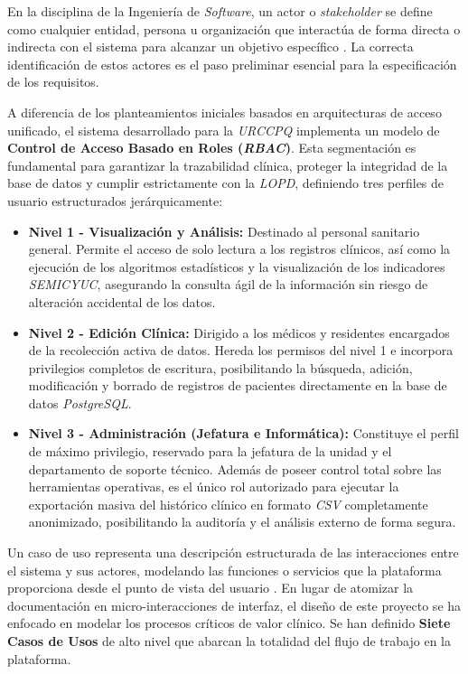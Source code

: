 En la disciplina de la Ingeniería de \textit{Software}, un actor o \textit{stakeholder} se define como cualquier entidad, persona u organización que interactúa de forma directa o indirecta con el sistema para alcanzar un objetivo específico \cite{sommerville2015}. La correcta identificación de estos actores es el paso preliminar esencial para la especificación de los requisitos.

A diferencia de los planteamientos iniciales basados en arquitecturas de acceso unificado, el sistema desarrollado para la \textit{URCCPQ} implementa un modelo de \textbf{Control de Acceso Basado en Roles (\textit{RBAC})}. Esta segmentación es fundamental para garantizar la trazabilidad clínica, proteger la integridad de la base de datos y cumplir estrictamente con la \textit{LOPD}, definiendo tres perfiles de usuario estructurados jerárquicamente:

\begin{itemize}
    \item \textbf{Nivel 1 - Visualización y Análisis:} Destinado al personal sanitario general. Permite el acceso de solo lectura a los registros clínicos, así como la ejecución de los algoritmos estadísticos y la visualización de los indicadores \textit{SEMICYUC}, asegurando la consulta ágil de la información sin riesgo de alteración accidental de los datos.
    \item \textbf{Nivel 2 - Edición Clínica:} Dirigido a los médicos y residentes encargados de la recolección activa de datos. Hereda los permisos del nivel 1 e incorpora privilegios completos de escritura, posibilitando la búsqueda, adición, modificación y borrado de registros de pacientes directamente en la base de datos \textit{PostgreSQL}.
    \item \textbf{Nivel 3 - Administración (Jefatura e Informática):} Constituye el perfil de máximo privilegio, reservado para la jefatura de la unidad y el departamento de soporte técnico. Además de poseer control total sobre las herramientas operativas, es el único rol autorizado para ejecutar la exportación masiva del histórico clínico en formato \textit{CSV} completamente anonimizado, posibilitando la auditoría y el análisis externo de forma segura.
\end{itemize}

Un caso de uso representa una descripción estructurada de las interacciones entre el sistema y sus actores, modelando las funciones o servicios que la plataforma proporciona desde el punto de vista del usuario \cite{jacobson1992}. En lugar de atomizar la documentación en micro-interacciones de interfaz, el diseño de este proyecto se ha enfocado en modelar los procesos críticos de valor clínico. Se han definido \textbf{Siete Casos de Usos} de alto nivel que abarcan la totalidad del flujo de trabajo en la plataforma.

